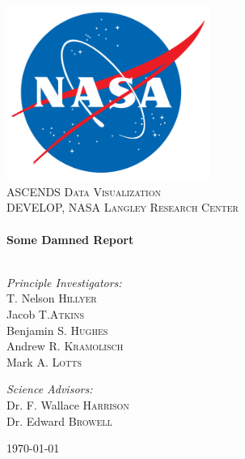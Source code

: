 \begin{titlepage}

\begin{center}

\includegraphics[width=0.5\textwidth]{./resources/logo}\\[1cm]

\textsc{\Huge ASCENDS Data Visualization}\\[1.5cm]

\textsc{\Large DEVELOP, NASA Langley Research Center}\\[0.5cm]

\HRule \\[0.4cm]
{ \huge \bfseries Some Damned Report}\\[0.4cm]

\HRule \\[1.5cm]

\begin{minipage}{0.45\textwidth}
\begin{flushleft} \large
\emph{Principle Investigators:}\\
T. Nelson \textsc{Hillyer}\\
Jacob T.\textsc{Atkins}\\
Benjamin S. \textsc{Hughes}\\
Andrew R. \textsc{Kramolisch}\\
Mark A. \textsc{Lotts}
\end{flushleft}
\end{minipage}
\begin{minipage}{0.45\textwidth}
\begin{flushright} \large
\emph{Science Advisors:}\\
Dr. F. Wallace \textsc{Harrison}\\
Dr. Edward \textsc{Browell}
\end{flushright}
\end{minipage}

\vfill

{\large \today}

\end{center}

\end{titlepage}

